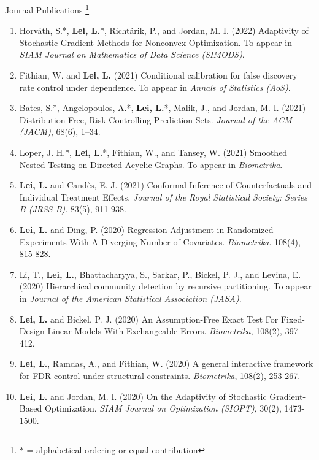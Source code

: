 \documentclass{article}
\begin{document}
\vspace{3mm}

\begin{large}
\noindent Journal Publications \footnote{$\ast$ = alphabetical ordering or equal contribution}
\end{large}

\begin{enumerate}
\item Horv\'{a}th, S.*, \textbf{Lei, L.}*, Richt\'{a}rik, P., and Jordan, M. I. (2022) Adaptivity of Stochastic Gradient Methods for Nonconvex Optimization. To appear in \emph{SIAM Journal on Mathematics of Data Science (SIMODS)}.
\item Fithian, W. and \textbf{Lei, L.} (2021) Conditional calibration for false discovery rate control under dependence. To appear in \emph{Annals of Statistics (AoS)}.
\item Bates, S.*, Angelopoulos, A.*, \textbf{Lei, L.}*, Malik, J., and Jordan, M. I. (2021) Distribution-Free, Risk-Controlling Prediction Sets. \emph{Journal of the ACM (JACM)}, 68(6), 1–34.
\item Loper, J. H.*, \textbf{Lei, L.}*, Fithian, W., and Tansey, W. (2021) Smoothed Nested Testing on Directed Acyclic Graphs. To appear in \emph{Biometrika}.
\item \textbf{Lei, L.} and Cand\`{e}s, E. J. (2021) Conformal Inference of Counterfactuals and Individual Treatment Effects. \emph{Journal of the Royal Statistical Society: Series B (JRSS-B)}. 83(5), 911-938.
\item \textbf{Lei, L.} and Ding, P. (2020) Regression Adjustment in Randomized Experiments With A Diverging Number of Covariates. \emph{Biometrika}. 108(4), 815-828.
\item Li, T., \textbf{Lei, L.}, Bhattacharyya, S., Sarkar, P., Bickel, P. J., and Levina, E. (2020) Hierarchical community detection by recursive partitioning. To appear in \emph{Journal of the American Statistical Association (JASA)}.
\item \textbf{Lei, L.} and Bickel, P. J. (2020) An Assumption-Free Exact Test For Fixed-Design Linear Models With Exchangeable Errors. \emph{Biometrika}, 108(2), 397-412.
\item \textbf{Lei, L.}, Ramdas, A., and Fithian, W. (2020) A general interactive framework for FDR control under structural constraints. \emph{Biometrika}, 108(2), 253-267.
\item \textbf{Lei, L.} and Jordan, M. I. (2020) On the Adaptivity of Stochastic Gradient-Based Optimization. \emph{SIAM Journal on Optimization (SIOPT)}, 30(2), 1473-1500.

\end{enumerate}
\end{document}
